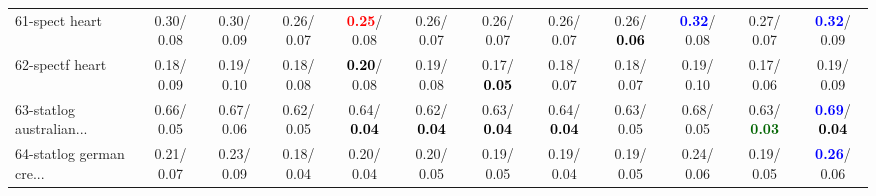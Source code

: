 \begin{table}[h]
\begin{center}
{\begin{tabular}{lc|c|c|c|c|c|c|c|c|c|c}
61-spect heart &   0.30/  0.08 &   0.30/  0.09 &   0.26/  0.07 & \textcolor{red}{\textbf{  0.25}}/  0.08 &   0.26/  0.07 &   0.26/  0.07 &   0.26/  0.07 &   0.26/\textcolor{black}{\textbf{  0.06}} & \textcolor{blue}{\textbf{  0.32}}/  0.08 &   0.27/  0.07 & \textcolor{blue}{\textbf{  0.32}}/  0.09 \\
62-spectf heart &   0.18/  0.09 &   0.19/  0.10 &   0.18/  0.08 & \textcolor{black}{\textbf{  0.20}}/  0.08 &   0.19/  0.08 &   0.17/\textcolor{black}{\textbf{  0.05}} &   0.18/  0.07 &   0.18/  0.07 &   0.19/  0.10 &   0.17/  0.06 &   0.19/  0.09 \\
63-statlog australian... &   0.66/  0.05 &   0.67/  0.06 &   0.62/  0.05 &   0.64/\textcolor{black}{\textbf{  0.04}} &   0.62/\textcolor{black}{\textbf{  0.04}} &   0.63/\textcolor{black}{\textbf{  0.04}} &   0.64/\textcolor{black}{\textbf{  0.04}} &   0.63/  0.05 &   0.68/  0.05 &   0.63/\textcolor{darkgreen}{\textbf{  0.03}} & \textcolor{blue}{\textbf{  0.69}}/\textcolor{black}{\textbf{  0.04}} \\
64-statlog german cre... &   0.21/  0.07 &   0.23/  0.09 &   0.18/  0.04 &   0.20/  0.04 &   0.20/  0.05 &   0.19/  0.05 &   0.19/  0.04 &   0.19/  0.05 &   0.24/  0.06 &   0.19/  0.05 & \textcolor{blue}{\textbf{  0.26}}/  0.06 \\\end{tabular}
}\label{strats1aRFw}
\end{center}
\end{table}
